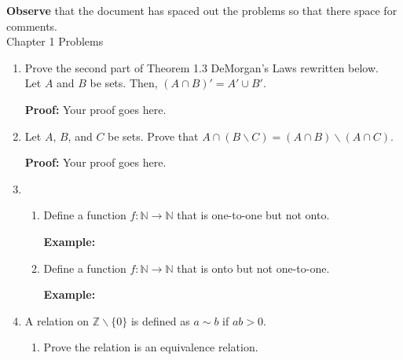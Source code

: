 \documentclass[12pt]{article}
\newcommand{\bbN}{\mathbb{N}}
\newcommand{\bbZ}{\mathbb{Z}}
\begin{document}
\textbf{Observe} that the document has spaced out the problems so that there space for comments.\\

Chapter 1 Problems\\

\begin{enumerate}
	\item Prove the second part of Theorem 1.3 DeMorgan's Laws rewritten below.\\
	
	Let $A$ and $B$ be sets. Then, $(A \cap B)'=A' \cup B'.$
	
\vspace{.3in}

\textbf{Proof:} Your proof goes here.
	
	
\vspace{3in}
	
	\item Let $A$, $B$, and $C$ be sets. Prove that $A \cap (B\backslash C) = (A \cap B)\backslash(A \cap C).$
	
\vspace{.3in}

\textbf{Proof:} Your proof goes here.
	
	\vspace{3in}

\item 
	\begin{enumerate}
	\item Define a function $f: \bbN \to \bbN$ that is one-to-one but not onto.
	
	\vspace{0.3in}
	
	\textbf{Example:} 
	
	\vspace{3in}
	
	\item Define a function $f: \bbN \to \bbN$ that is onto but not one-to-one.
	
	\vspace{0.3in}
	
	\textbf{Example:} 
	
	\vspace{3in}
	\end{enumerate}
	
\item A relation on $\bbZ \backslash \{0\}$ is defined as $a \sim b$ if $ab >0.$
	\begin{enumerate}
	\item Prove the relation is an equivalence relation.
	

\end{enumerate}
\end{enumerate}
\end{document}

